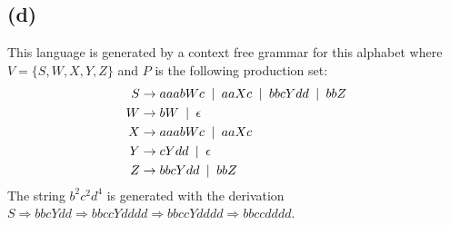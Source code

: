 \documentclass{article}
\begin{document}
	\subsection*{(d)}
	This language is generated by a context free grammar for this alphabet where $V = \{S, W, X, Y, Z\}$ and $P$ is the following production set:
		\begin{align*}
			S &\rightarrow aaabWc \hphantom{a} | \hphantom{a} aaXc \hphantom{a} | \hphantom{a} bbcYdd \hphantom{a} | \hphantom{a} bbZ\\
			W &\rightarrow bW \hphantom{a} | \hphantom{a} \epsilon\\
			X &\rightarrow aaabWc \hphantom{a} | \hphantom{a} aaXc\\
			Y &\rightarrow cYdd \hphantom{a} | \hphantom{a} \epsilon\\
			Z &\rightarrow bbcYdd \hphantom{a} | \hphantom{a} bbZ
		\end{align*}
	The string $b^2c^2d^4$ is generated with the derivation $S \Rightarrow bbcYdd \Rightarrow bbccYdddd \Rightarrow bbccYdddd \Rightarrow bbccdddd$.
\end{document}
